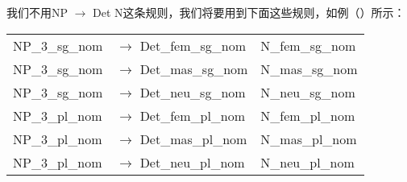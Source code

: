\zl
我们不用NP $\to$ Det N这条规则，我们将要用到下面这些规则，如例（）所示：  
\ea
\begin{tabular}[t]{@{}l@{ }l@{~~}l}
NP\_3\_sg\_nom  & $\to$ Det\_fem\_sg\_nom & N\_fem\_sg\_nom \\
NP\_3\_sg\_nom  & $\to$ Det\_mas\_sg\_nom & N\_mas\_sg\_nom \\
NP\_3\_sg\_nom  & $\to$ Det\_neu\_sg\_nom & N\_neu\_sg\_nom \\
NP\_3\_pl\_nom  & $\to$ Det\_fem\_pl\_nom & N\_fem\_pl\_nom \\
NP\_3\_pl\_nom  & $\to$ Det\_mas\_pl\_nom & N\_mas\_pl\_nom \\
NP\_3\_pl\_nom  & $\to$ Det\_neu\_pl\_nom & N\_neu\_pl\_nom \\[2mm]
\end{tabular}


